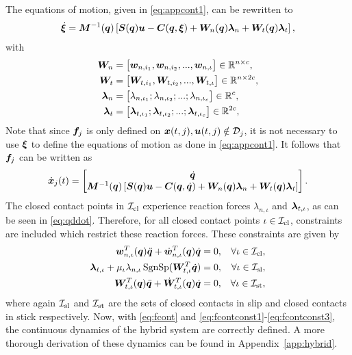 \documentclass[../DC2017114Bouma.tex]{subfiles}
\begin{document}
The equations of motion, given in \eqref{eq:appcont1}, can be rewritten to
\begin{align}
\dot{\boldsymbol{\xi}} = {\boldsymbol{M}}^{-1}({\boldsymbol{q}})\left[ {\boldsymbol{S}}({\boldsymbol{q}}){\boldsymbol{u}} - {\boldsymbol{C}}({\boldsymbol{q}},\boldsymbol{\xi}) + {\boldsymbol{W}}_{n}({\boldsymbol{q}})\boldsymbol{\lambda}_{n} + {\boldsymbol{W}}_{t}({\boldsymbol{q}})\boldsymbol{\lambda}_{t}\right],\label{eq:qddot}
\end{align}
with
\begin{align}
{\boldsymbol{W}}_n &= \begin{bmatrix}
{\boldsymbol{w}}_{n,i_1},{\boldsymbol{w}}_{n,i_2},...,{\boldsymbol{w}}_{n,\iota}
\end{bmatrix}\in\mathbb{R}^{n\times c},\\
{\boldsymbol{W}}_t &= \begin{bmatrix}
{\boldsymbol{W}}_{t,i_1},{\boldsymbol{W}}_{t,i_2},...,{\boldsymbol{W}}_{t,\iota} 
\end{bmatrix}\in\mathbb{R}^{n\times 2c},\\
\boldsymbol{\lambda}_n &= \begin{bmatrix}
\lambda_{n,\iota_1};\lambda_{n,\iota_2};...;\lambda_{n,\iota_c} 
\end{bmatrix}\in\mathbb{R}^{c},\\
\boldsymbol{\lambda}_t &= \begin{bmatrix}
\boldsymbol{\lambda}_{t,\iota_1};\boldsymbol{\lambda}_{t,\iota_2};...;\boldsymbol{\lambda}_{t,\iota_c} 
\end{bmatrix}\in\mathbb{R}^{2c},
\end{align}
Note that since ${\boldsymbol{f}}_j$ is only defined on ${\boldsymbol{x}}(t,j),{\boldsymbol{u}}(t,j)\notin \mathcal{D}_j$, it is not necessary to use $\boldsymbol{\xi}$ to define the equations of motion as done in \eqref{eq:appcont1}. It follows that ${\boldsymbol{f}}_j$ can be written as
\begin{align}
\dot{{\boldsymbol{x}}}_j(t) =\begin{bmatrix}
\dot{{\boldsymbol{q}}}\\ {\boldsymbol{M}}^{-1}({\boldsymbol{q}})\left[ {\boldsymbol{S}}({\boldsymbol{q}}){\boldsymbol{u}} - {\boldsymbol{C}}({\boldsymbol{q}},\dot{{\boldsymbol{q}}}) + {\boldsymbol{W}}_{n}({\boldsymbol{q}})\boldsymbol{\lambda}_{n} + {\boldsymbol{W}}_{t}({\boldsymbol{q}})\boldsymbol{\lambda}_{t}\right]
\end{bmatrix}.\label{eq:fcont}
\end{align}
The closed contact points in $\mathcal{I}_{\text{cl}}$ experience reaction forces $\lambda_{n,\iota}$ and $\boldsymbol{\lambda}_{t,\iota}$, as can be seen in \eqref{eq:qddot}. Therefore, for all closed contact points $\iota\in\mathcal{I}_{\text{cl}}$, constraints are included which restrict these reaction forces. These constraints are given by
\begin{align}
{\boldsymbol{w}}^T_{n,\iota}({\boldsymbol{q}})\ddot{{\boldsymbol{q}}} + \dot{{\boldsymbol{w}}}^T_{n,\iota}({\boldsymbol{q}})\dot{{\boldsymbol{q}}} &= 0, &\forall \iota\in\mathcal{I}_{\text{cl}},\label{eq:fcontconst1}\\
\boldsymbol{\lambda}_{t,\iota} + \mu_{\iota}\lambda_{n,\iota}\operatorname{\text{SgnSp}}({\boldsymbol{W}}_{t,\iota}^T\dot{{\boldsymbol{q}}}) &= 0, &\forall \iota\in\mathcal{I}_{\text{sl}},\label{eq:fcontconst2}\\
{\boldsymbol{W}}^T_{t,\iota}({\boldsymbol{q}})\ddot{{\boldsymbol{q}}} + \dot{{\boldsymbol{W}}}^T_{t,\iota}({\boldsymbol{q}})\dot{{\boldsymbol{q}}} &= 0, &\forall \iota\in\mathcal{I}_{\text{st}},\label{eq:fcontconst3}
\end{align}
where again $\mathcal{I}_{\text{sl}}$ and $\mathcal{I}_{\text{st}}$ are the sets of closed contacts in slip and closed contacts in stick respectively. Now, with \eqref{eq:fcont} and \eqref{eq:fcontconst1}-\eqref{eq:fcontconst3}, the continuous dynamics of the hybrid system are correctly defined. A more thorough derivation of these dynamics can be found in Appendix~\ref{app:hybrid}.
\end{document}
